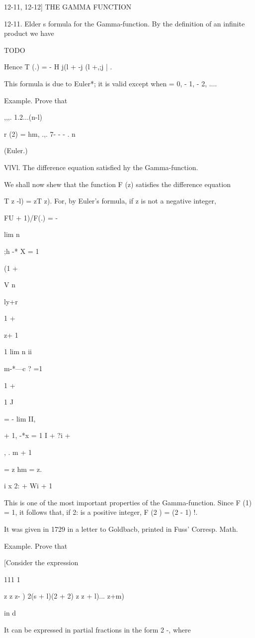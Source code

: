 12-11, 12-12] THE GAMMA FUNCTION

12-11. Elder s formula for the Gamma-function. By the definition of an
infinite product we have

TODO

Hence T (.) = - H j(l + -j (l +,;j | .

This formula is due to Euler*; it is valid except when = 0, - 1, - 2,
....

Example. Prove that

,,,. 1.2...(n-l)

r (2) = hm, .,. 7- - - . n\

(Euler.)

VlVl. The difference equation satisfied hy the Gamma-function.

We shall now shew that the function F (z) satisfies the difference
equation

T z -l) = zT z). For, by Euler's formula, if z is not a negative
integer,

FU + 1)/F(.) = -

lim n

;h -* X = 1

(1 +

V n

ly+r

1 +

z+ 1

1 lim n ii

m-*---c ? =1

1 +

1 J

= - lim II,

  + 1, -*x = 1 I + ?i +

, . m + 1

= z hm = z.

 i x 2: + Wi + 1

This is one of the most important properties of the Gamma-function.
Since F (1) = 1, it follows that, if 2: is a positive integer, F (2 )
= (2 - 1) !.

It was given in 1729 in a letter to Goldbacb, printed in Fuss'
Corresp. Math.

%
%

Example. Prove that

[Consider the expression

111 1

z z z- ) 2(s + l)(2 + 2) z z + l)... z+m)

in d

It can be expressed in partial fractions in the form 2 -, where

